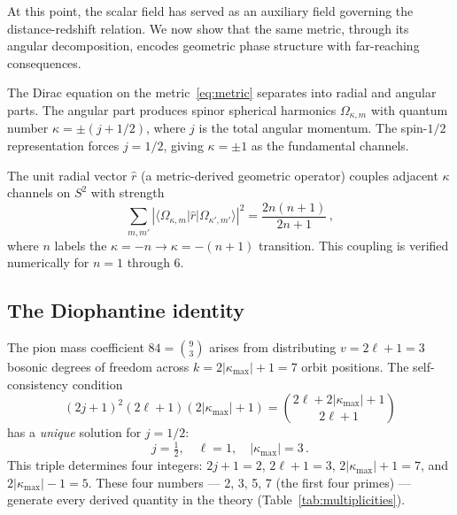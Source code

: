 \documentclass[aps,prd,twocolumn,superscriptaddress,nofootinbib,longbibliography]{revtex4-2}
\newcommand{\kmax}{|\kappa_{\mathrm{max}}|}
\begin{document}
At this point, the scalar field has served as an auxiliary field
governing the distance-redshift relation.  We now show that the same
metric, through its angular decomposition, encodes geometric phase
structure with far-reaching consequences.

The Dirac equation on the metric~\eqref{eq:metric} separates into
radial and angular parts.  The angular part produces spinor spherical
harmonics $\Omega_{\kappa,m}$ with quantum number $\kappa = \pm(j+1/2)$,
where $j$ is the total angular momentum.  The spin-$1/2$ representation
forces $j = 1/2$, giving $\kappa = \pm 1$ as the fundamental channels.

The unit radial vector $\hat{r}$ (a metric-derived geometric operator)
couples adjacent $\kappa$ channels on $S^2$ with strength
\begin{equation}\label{eq:rcoupling}
  \sum_{m,m'}\!\left|\langle\Omega_{\kappa,m}|\hat{r}|
    \Omega_{\kappa',m'}\rangle\right|^2
  = \frac{2n(n+1)}{2n+1}\,,
\end{equation}
where $n$ labels the $\kappa = -n \to \kappa = -(n+1)$ transition.
This coupling is verified numerically for $n = 1$ through 6.

\subsection{The Diophantine identity}

The pion mass coefficient $84 = \binom{9}{3}$ arises from distributing
$v = 2\ell + 1 = 3$ bosonic degrees of freedom across
$k = 2\kmax + 1 = 7$ orbit positions.  The self-consistency condition
\begin{equation}\label{eq:diophantine}
  (2j+1)^2(2\ell+1)(2\kmax+1)
  = \binom{2\ell + 2\kmax + 1}{2\ell+1}
\end{equation}
has a \emph{unique} solution for $j = 1/2$:
\begin{equation}\label{eq:jlk}
  j = \tfrac{1}{2},\quad \ell = 1,\quad \kmax = 3\,.
\end{equation}
This triple determines four integers: $2j+1 = 2$, $2\ell+1 = 3$,
$2\kmax + 1 = 7$, and $2\kmax - 1 = 5$.  These four
numbers --- 2, 3, 5, 7 (the first four primes) --- generate every
derived quantity in the theory (Table~\ref{tab:multiplicities}).
\end{document}
